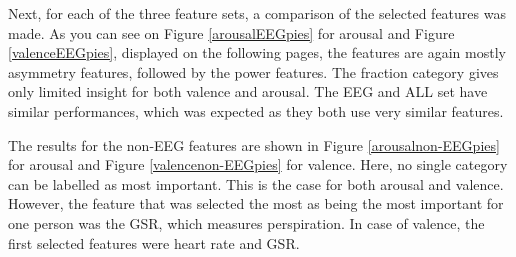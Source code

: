 Next, for each of the three feature sets, a comparison of the selected features was made. As you can see on Figure \ref{arousalEEGpies} for arousal and Figure \ref{valenceEEGpies}, displayed on the following pages, the features are again mostly asymmetry features, followed by the power features. The fraction category gives only limited insight for both valence and arousal. The EEG and ALL set have similar performances, which was expected as they both use very similar features.

\npar

The results for the non-EEG features are shown in Figure \ref{arousalnon-EEGpies} for arousal and Figure \ref{valencenon-EEGpies} for valence.
Here, no single category can be labelled as most important. This is the case for both arousal and valence. However, the feature that was selected the most as being the most important for one person was the GSR, which measures perspiration. In case of valence, the first selected features were heart rate and GSR.

